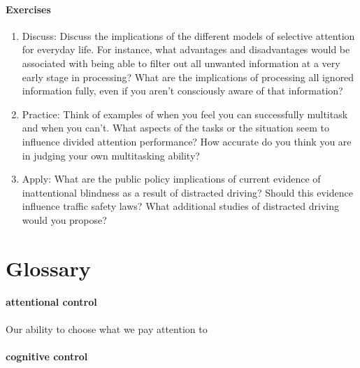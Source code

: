 \documentclass[
]{krantz}
\providecommand{\tightlist}{%
  \setlength{\itemsep}{0pt}\setlength{\parskip}{0pt}}
\begin{document}
\hypertarget{exercises-2}{%
\paragraph*{Exercises}\label{exercises-2}}

\begin{enumerate}
\def\labelenumi{\arabic{enumi}.}
\tightlist
\item
  Discuss: Discuss the implications of the different models of selective attention for everyday life. For instance, what advantages and disadvantages would be associated with being able to filter out all unwanted information at a very early stage in processing? What are the implications of processing all ignored information fully, even if you aren't consciously aware of that information?
\item
  Practice: Think of examples of when you feel you can successfully multitask and when you can't. What aspects of the tasks or the situation seem to influence divided attention performance? How accurate do you think you are in judging your own multitasking ability?
\item
  Apply: What are the public policy implications of current evidence of inattentional blindness as a result of distracted driving? Should this evidence influence traffic safety laws? What additional studies of distracted driving would you propose?
\end{enumerate}

\hypertarget{glossary-2}{%
\section{Glossary}\label{glossary-2}}

\hypertarget{attentional-control}{%
\paragraph*{attentional control}\label{attentional-control}}

Our ability to choose what we pay attention to

\hypertarget{cognitive-control}{%
\paragraph*{cognitive control}\label{cognitive-control}}
\end{document}
